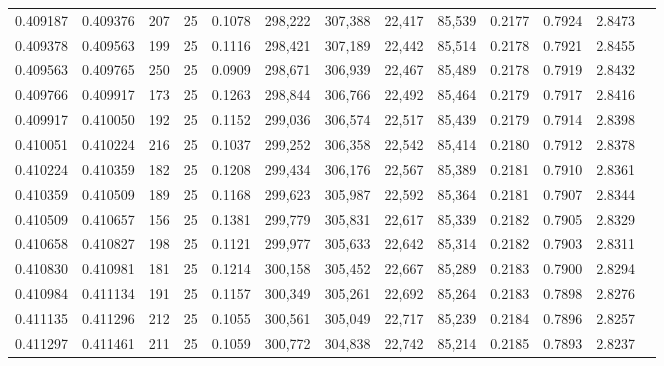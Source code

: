 \begin{tabular}{rrrrrrrrrrrrr}
0.409187 & 0.409376 &   207 &  25 &                                     0.1078 & 298,222 & 307,388 &  22,417 &  85,539 & 0.2177 & 0.7924 & 2.8473 \\
0.409378 & 0.409563 &   199 &  25 &                                     0.1116 & 298,421 & 307,189 &  22,442 &  85,514 & 0.2178 & 0.7921 & 2.8455 \\
0.409563 & 0.409765 &   250 &  25 &                                     0.0909 & 298,671 & 306,939 &  22,467 &  85,489 & 0.2178 & 0.7919 & 2.8432 \\
0.409766 & 0.409917 &   173 &  25 &                                     0.1263 & 298,844 & 306,766 &  22,492 &  85,464 & 0.2179 & 0.7917 & 2.8416 \\
0.409917 & 0.410050 &   192 &  25 &                                     0.1152 & 299,036 & 306,574 &  22,517 &  85,439 & 0.2179 & 0.7914 & 2.8398 \\
0.410051 & 0.410224 &   216 &  25 &                                     0.1037 & 299,252 & 306,358 &  22,542 &  85,414 & 0.2180 & 0.7912 & 2.8378 \\
0.410224 & 0.410359 &   182 &  25 &                                     0.1208 & 299,434 & 306,176 &  22,567 &  85,389 & 0.2181 & 0.7910 & 2.8361 \\
0.410359 & 0.410509 &   189 &  25 &                                     0.1168 & 299,623 & 305,987 &  22,592 &  85,364 & 0.2181 & 0.7907 & 2.8344 \\
0.410509 & 0.410657 &   156 &  25 &                                     0.1381 & 299,779 & 305,831 &  22,617 &  85,339 & 0.2182 & 0.7905 & 2.8329 \\
0.410658 & 0.410827 &   198 &  25 &                                     0.1121 & 299,977 & 305,633 &  22,642 &  85,314 & 0.2182 & 0.7903 & 2.8311 \\
0.410830 & 0.410981 &   181 &  25 &                                     0.1214 & 300,158 & 305,452 &  22,667 &  85,289 & 0.2183 & 0.7900 & 2.8294 \\
0.410984 & 0.411134 &   191 &  25 &                                     0.1157 & 300,349 & 305,261 &  22,692 &  85,264 & 0.2183 & 0.7898 & 2.8276 \\
0.411135 & 0.411296 &   212 &  25 &                                     0.1055 & 300,561 & 305,049 &  22,717 &  85,239 & 0.2184 & 0.7896 & 2.8257 \\
0.411297 & 0.411461 &   211 &  25 &                                     0.1059 & 300,772 & 304,838 &  22,742 &  85,214 & 0.2185 & 0.7893 & 2.8237 \\

\end{tabular}
